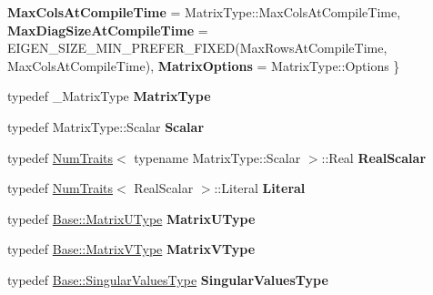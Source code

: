 \begin{DoxyCompactItemize}
\newline
{\bfseries Max\+Cols\+At\+Compile\+Time} = Matrix\+Type\+:\+:Max\+Cols\+At\+Compile\+Time, 
{\bfseries Max\+Diag\+Size\+At\+Compile\+Time} = E\+I\+G\+E\+N\+\_\+\+S\+I\+Z\+E\+\_\+\+M\+I\+N\+\_\+\+P\+R\+E\+F\+E\+R\+\_\+\+F\+I\+X\+ED(Max\+Rows\+At\+Compile\+Time, Max\+Cols\+At\+Compile\+Time), 
{\bfseries Matrix\+Options} = Matrix\+Type\+:\+:Options
 \}
\item 
\mbox{\label{group___s_v_d___module_a8c3310eee662af4ca2428f7afd1472ed}} 
typedef \+\_\+\+Matrix\+Type {\bfseries Matrix\+Type}
\item 
\mbox{\label{group___s_v_d___module_aaeab2cfc3f87e2a2c595a9d5b4d97c71}} 
typedef Matrix\+Type\+::\+Scalar {\bfseries Scalar}
\item 
\mbox{\label{group___s_v_d___module_a2eb49279d7a1760eed1346fb8a0da629}} 
typedef \hyperlink{group___core___module_struct_eigen_1_1_num_traits}{Num\+Traits}$<$ typename Matrix\+Type\+::\+Scalar $>$\+::Real {\bfseries Real\+Scalar}
\item 
\mbox{\label{group___s_v_d___module_aad17038f9628ce5ed6e1461a67cd3a03}} 
typedef \hyperlink{group___core___module_struct_eigen_1_1_num_traits}{Num\+Traits}$<$ Real\+Scalar $>$\+::Literal {\bfseries Literal}
\item 
\mbox{\label{group___s_v_d___module_a4c38005126c75b1ba3b1b95117b4546d}} 
typedef \hyperlink{group___core___module}{Base\+::\+Matrix\+U\+Type} {\bfseries Matrix\+U\+Type}
\item 
\mbox{\label{group___s_v_d___module_a1a1140cddb7727637b5e33d9f3b13299}} 
typedef \hyperlink{group___core___module}{Base\+::\+Matrix\+V\+Type} {\bfseries Matrix\+V\+Type}
\item 
\mbox{\label{group___s_v_d___module_a44cd685aa8d3807c006f6557bd69abf8}} 
typedef \hyperlink{class_eigen_1_1internal_1_1_tensor_lazy_evaluator_writable}{Base\+::\+Singular\+Values\+Type} {\bfseries Singular\+Values\+Type}
\item 
\mbox{\label{group___s_v_d___module_acf9211e5353d60fc3209d62fa0e2bdf7}} 

\end{DoxyCompactItemize}
